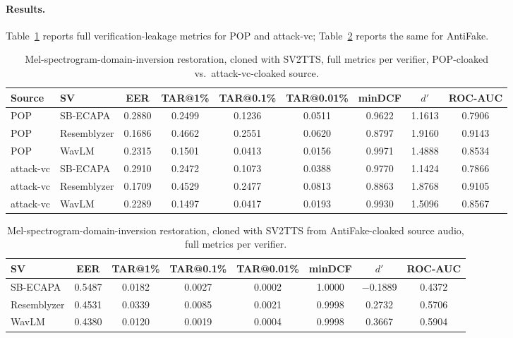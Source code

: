 \documentclass[11pt]{article}
\begin{document}
\paragraph{Results.} Table~\ref{tab:restoration-mel-results} reports
full verification-leakage metrics for POP and attack-vc;
Table~\ref{tab:restoration-mel-antifake-results} reports the same for
AntiFake.

\begin{table}[H]
\centering
\caption{Mel-spectrogram-domain-inversion restoration, cloned with
SV2TTS, full metrics per verifier, POP-cloaked vs.\ attack-vc-cloaked
source.}
\label{tab:restoration-mel-results}
\begin{tabular}{llccccccc}
\toprule
Source & SV & EER & TAR@1\% & TAR@0.1\% & TAR@0.01\% & minDCF & $d'$ & ROC-AUC \\
\midrule
POP        & SB-ECAPA    & 0.2880 & 0.2499 & 0.1236 & 0.0511 & 0.9622 & 1.1613 & 0.7906 \\
POP        & Resemblyzer & 0.1686 & 0.4662 & 0.2551 & 0.0620 & 0.8797 & 1.9160 & 0.9143 \\
POP        & WavLM       & 0.2315 & 0.1501 & 0.0413 & 0.0156 & 0.9971 & 1.4888 & 0.8534 \\
\addlinespace
attack-vc  & SB-ECAPA    & 0.2910 & 0.2472 & 0.1073 & 0.0388 & 0.9770 & 1.1424 & 0.7866 \\
attack-vc  & Resemblyzer & 0.1709 & 0.4529 & 0.2477 & 0.0813 & 0.8863 & 1.8768 & 0.9105 \\
attack-vc  & WavLM       & 0.2289 & 0.1497 & 0.0417 & 0.0193 & 0.9930 & 1.5096 & 0.8567 \\
\bottomrule
\end{tabular}
\end{table}

\begin{table}[H]
\centering
\caption{Mel-spectrogram-domain-inversion restoration, cloned with
SV2TTS from AntiFake-cloaked source audio, full metrics per verifier.}
\label{tab:restoration-mel-antifake-results}
\begin{tabular}{lccccccc}
\toprule
SV & EER & TAR@1\% & TAR@0.1\% & TAR@0.01\% & minDCF & $d'$ & ROC-AUC \\
\midrule
SB-ECAPA    & 0.5487 & 0.0182 & 0.0027 & 0.0002 & 1.0000 & $-$0.1889 & 0.4372 \\
Resemblyzer & 0.4531 & 0.0339 & 0.0085 & 0.0021 & 0.9998 & 0.2732 & 0.5706 \\
WavLM       & 0.4380 & 0.0120 & 0.0019 & 0.0004 & 0.9998 & 0.3667 & 0.5904 \\
\bottomrule
\end{tabular}
\end{table}
\end{document}

